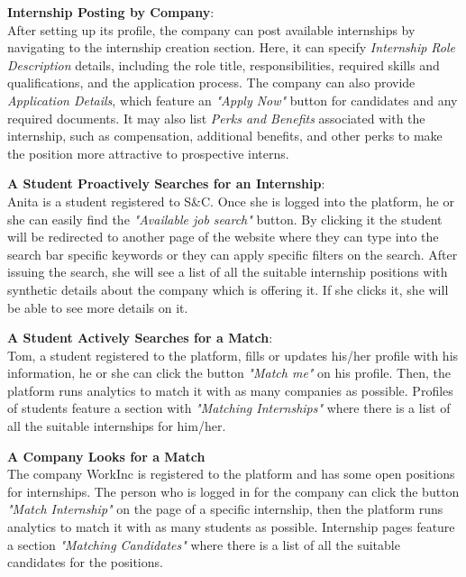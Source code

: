 {\begin{enumerate}[label=\textbf{[\arabic*]}, left = 0 pt, align = left]
\item \textbf{Internship Posting by Company}:                   %
\\After setting up its profile, the company can post available internships by navigating to the internship creation section. Here, it can specify \textit{Internship Role Description} details, including the role title, responsibilities, required skills and qualifications, and the application process.
The company can also provide \textit{Application Details}, which feature an \textit{"Apply Now"} button for candidates and any required documents. It may also list \textit{Perks and Benefits} associated with the internship, such as compensation, additional benefits, and other perks to make the position more attractive to prospective interns.

\item \textbf{A Student Proactively Searches for an Internship}:  %
\\Anita is a student registered to S\&C. Once she is logged into the platform, he or she can easily find the \textit{"Available job search"} button. By clicking it the student will be redirected to another page of the website where they can type into the search bar specific keywords or they can apply specific filters on the search. After issuing the search, she will see a list of all the suitable internship positions with synthetic details about the company which is offering it. If she clicks it, she will be able to see more details on it.

\item \textbf{A Student Actively Searches for a Match}:     %
\\Tom, a student registered to the platform, fills or updates his/her profile with his information, he or she can click the button \textit{"Match me"} on his profile. Then, the platform runs analytics to match it with as many companies as possible. Profiles of students feature a section with \textit{"Matching Internships"} where there is a list of all the suitable internships for him/her.

\item \textbf{A Company Looks for a Match}   
\\The company WorkInc is registered to the platform and has some open positions for internships. The person who is logged in for the company can click the button \textit{"Match Internship"} on the page of a specific internship, then the platform runs analytics to match it with as many students as possible. Internship pages feature a section \textit{"Matching Candidates"} where there is a list of all the suitable candidates for the positions.


\end{enumerate}}
